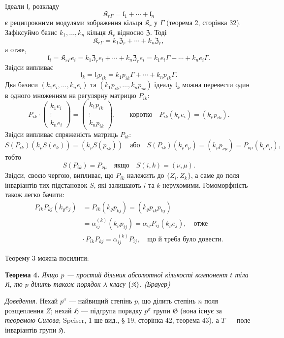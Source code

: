 \documentclass[11pt]{article}
\begin{document}
Ідеали \(\mathfrak l_i\) розкладу
\[
\mathfrak K_{r\Gamma}=\mathfrak l_1+\cdots+\mathfrak l_n
\]
є реципрокними модулями зображення кільця \(\mathfrak K_r\) у \(\Gamma\) (теорема 2, сторінка 32). Зафіксуймо базис \(k_1,\ldots,k_n\) кільця \(\mathfrak K_r\) відносно \(\mathfrak Z\). Тоді
\[
\mathfrak K_{r\Gamma}=k_1\mathfrak Z_r+\cdots+k_n\mathfrak Z_r,
\]
а отже,
\[
\mathfrak l_i=\mathfrak K_{r\Gamma}e_i
=k_1\mathfrak Z_r e_i+\cdots+k_n\mathfrak Z_r e_i
=k_1e_i\Gamma+\cdots+k_ne_i\Gamma.
\]
Звідси випливає
\[
\mathfrak l_k=\mathfrak l_i p_{ik}
=k_1p_{ik}\Gamma+\cdots+k_np_{ik}\Gamma.
\]
Два базиси \((k_1e_i,\ldots,k_ne_i)\) та \((k_1p_{ik},\ldots,k_np_{ik})\) ідеалу \(\mathfrak l_k\) можна перевести один в одного множенням на регулярну матрицю \(P_{ik}\):
\[
P_{ik}\cdot
\begin{pmatrix}
k_1e_i\\ \vdots\\ k_ne_i
\end{pmatrix}
=
\begin{pmatrix}
k_1p_{ik}\\ \vdots\\ k_np_{ik}
\end{pmatrix},
\qquad
\text{коротко}\quad
P_{ik}(k_\varrho e_i)=(k_\varrho p_{ik}).
\]
Звідси випливає спряженість матриць \(P_{ik}\):
\[
S(P_{ik})(k_\varrho S(e_k))=(k_\varrho S(p_{ik}))
\quad\text{або}\quad
S(P_{ik})(k_\varrho e_\mu)=(k_\varrho p_{\nu\mu})
=P_{\nu\mu}(k_\varrho e_\mu),
\]
тобто
\[
S(P_{ik})=P_{\nu\mu}\quad\text{якщо}\quad S(i,k)=(\nu,\mu).
\]
Звідси, своєю чергою, випливає, що \(P_{ik}\) належить до \(\{Z_i,Z_k\}\), а саме до поля інваріантів тих підстановок \(S\), які залишають \(i\) та \(k\) нерухомими. Гомоморфність також легко бачити:
\[
\begin{split}
P_{ik}P_{kj}(k_\varrho e_j)
&=P_{ik}(k_\varrho p_{kj})
=(k_\varrho p_{ik}p_{kj})\\
&=\alpha_{ij}^{(k)}(k_\varrho p_{ij})
=\alpha_{ij}P_{ij}(k_\varrho e_j),
\quad\text{отже}\\
&\cdot\, P_{ik}P_{kj}=\alpha_{ij}^{(k)}P_{ij},
\quad\text{що й треба було довести.}
\end{split}
\]

Теорему 3 можна посилити:

\textbf{Теорема 4.} \emph{Якщо \(p\) --- простий дільник абсолютної кількості компонент \(t\) тіла \(\mathfrak K\), то \(p\) ділить також порядок \(\lambda\) класу \(\{\mathfrak K\}\). (Брауер)}

\emph{Доведення.} Нехай \(p^\sigma\) --- найвищий степінь \(p\), що ділить степінь \(n\) поля розщеплення \(Z\); нехай \(\mathfrak H\) --- підгрупа порядку \(p^\sigma\) групи \(\mathfrak G\) (вона існує за \emph{теоремою Силова}; Speiser, 1-ше вид., § 19, сторінка 42, теорема 43), а \(T\) --- поле інваріантів групи \(\mathfrak H\).
\end{document}
